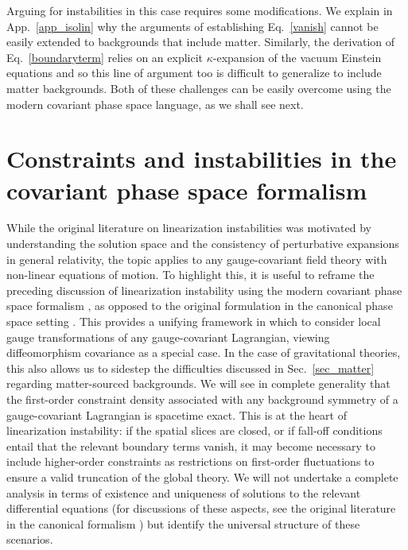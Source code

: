 \documentclass[]{jkpaper}
\theoremstyle{plain}
\theoremstyle{definition}
\begin{document}
Arguing for instabilities in this case requires some modifications. We explain in App.~\ref{app_isolin} why the arguments of \cite{fischer1980structure} establishing Eq.~\eqref{vanish} cannot be easily extended to backgrounds that include matter. Similarly, the derivation of Eq.~\eqref{boundaryterm} relies on an explicit $\kappa$-expansion of the vacuum Einstein equations and so this line of argument too is difficult to generalize to include matter backgrounds. Both of these challenges can be easily overcome using the modern covariant phase space language, as we shall see next.

\section{Constraints and instabilities in the covariant phase space formalism}
\label{sec: Constraints in the covariant phase space}

While the original literature on linearization instabilities was motivated by understanding the solution space and the consistency of perturbative expansions in general relativity, the topic applies to any gauge-covariant field theory with non-linear equations of motion. To highlight this, it is useful to reframe the preceding discussion of linearization instability using the modern covariant phase space formalism \cite{Witten_Crnkovic,Lee:1990nz, Wald:1993nt, Jacobson:1993vj, Wald:1999wa, Iyer:1994ys, Iyer:1995kg}, as opposed to the original formulation in the canonical phase space setting \cite{fischer1980structure,Arms:1982ea,Marsden_lectures,Deser:1973zza,Moncrief1,Moncrief:1976un,Arms:1982ea,Deser:1973zzb,choquet1979maximal,Arms1,Saraykar:1981qm,Saraykar2,Arms:1979au,Arms:1982ea}.   This provides a unifying framework in which to consider local gauge transformations of any gauge-covariant Lagrangian, viewing diffeomorphism covariance as a special case. In the case of gravitational theories, this also allows us to sidestep the difficulties discussed in Sec.~\ref{sec_matter} regarding matter-sourced backgrounds.  We will see in complete generality that the first-order constraint density associated with any background symmetry of a gauge-covariant Lagrangian is spacetime exact.  This is at the heart of linearization instability: if the spatial slices are closed, or if fall-off conditions entail that the relevant boundary terms vanish, it may become necessary to include higher-order constraints as restrictions on first-order fluctuations to ensure a valid truncation of the global theory.  We will not undertake a complete analysis in terms of existence and uniqueness of solutions to the relevant differential equations (for discussions of these aspects, see the original literature in the canonical formalism \cite{Moncrief1,Moncrief:1976un,fischer1980structure,Arms:1982ea,Arms1,Arms:1979au,Saraykar:1981qm,Saraykar2,Marsden_lectures,Deser:1973zzb,choquet1979maximal,Moncrief:1977hy,Arms_1981}) but identify the universal structure of these scenarios.
\end{document}
